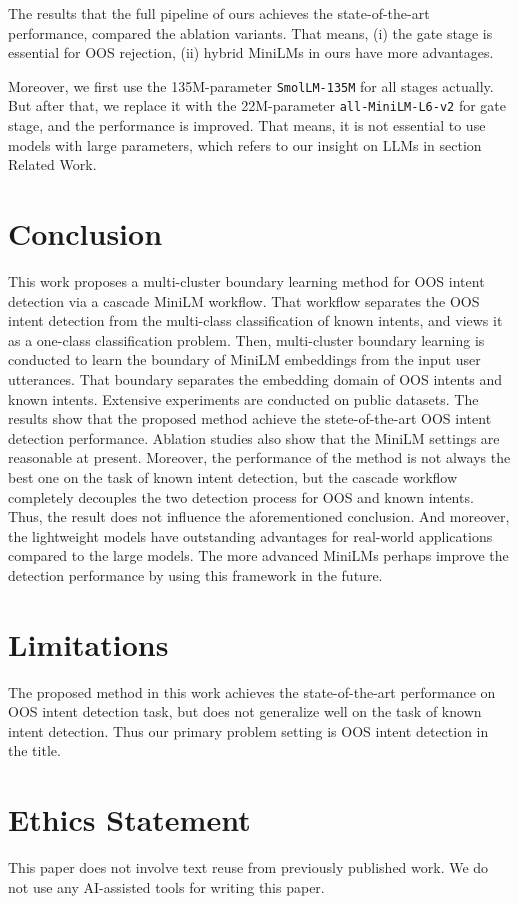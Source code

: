 \documentclass[11pt]{article}
\begin{document}
The results that the full pipeline of ours achieves the state-of-the-art performance, compared the ablation variants. That means, (i) the gate stage is essential for OOS rejection, (ii) hybrid MiniLMs in ours have more advantages.

Moreover, we first use the 135M-parameter \texttt{SmolLM-135M} for all stages actually. But after that, we replace it with the 22M-parameter \texttt{all-MiniLM-L6-v2} for gate stage, and the performance is improved. That means, it is not essential to use models with large parameters, which refers to our insight on LLMs in section Related Work.

\section{Conclusion}

This work proposes a multi-cluster boundary learning method for OOS intent detection via a cascade MiniLM workflow. That workflow separates the OOS intent detection from the multi-class classification of known intents, and views it as a one-class classification problem. Then, multi-cluster boundary learning is conducted to learn the boundary of MiniLM embeddings from the input user utterances. That boundary separates the embedding domain of OOS intents and known intents. Extensive experiments are conducted on public datasets. The results show that the proposed method achieve the stete-of-the-art OOS intent detection performance. Ablation studies also show that the MiniLM settings are reasonable at present. Moreover, the performance of the method is not always the best one on the task of known intent detection, but the cascade workflow completely decouples the two detection process for OOS and known intents. Thus, the result does not influence the aforementioned conclusion. And moreover, the lightweight models have outstanding advantages for real-world applications compared to the large models. The more advanced MiniLMs perhaps improve the detection performance by using this framework in the future.       




\section*{Limitations}
The proposed method in this work achieves the state-of-the-art performance on OOS intent detection task, but does not generalize well on the task of known intent detection. Thus our primary problem setting is OOS intent detection in the title. 

\section*{Ethics Statement}
This paper does not involve text reuse from previously published work. We do not use any AI-assisted tools for writing this paper.


\end{document}
